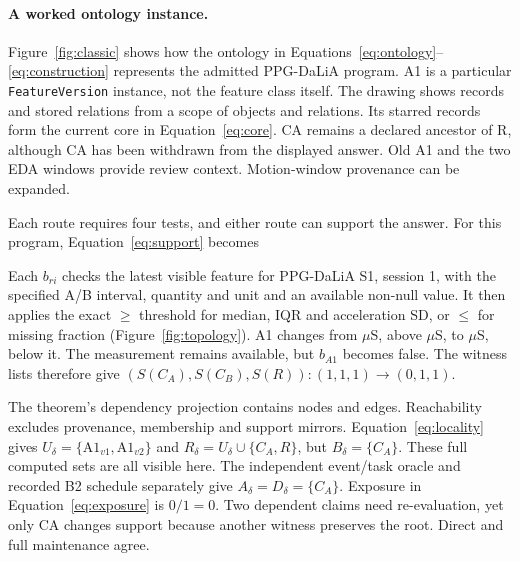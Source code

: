 \paragraph{A worked ontology instance.}
Figure~\ref{fig:classic} shows how the ontology in
Equations~\ref{eq:ontology}--\ref{eq:construction} represents the admitted
PPG-DaLiA program. A1 is a particular \texttt{FeatureVersion} instance, not the
feature class itself. The drawing shows \ClassicNodes{} records and
\ClassicEdges{} stored relations from a scope of \ClassicScopeNodes{} objects
and \ClassicScopeEdges{} relations. Its \ClassicCore{} starred records form the
current core in Equation~\ref{eq:core}. CA remains a declared ancestor of R,
although CA has been withdrawn from the displayed answer. Old A1 and the two
EDA windows provide review context. Motion-window provenance can be expanded.

Each route requires four tests, and either route can support the answer.
For this program, Equation~\ref{eq:support} becomes

Each $b_{ri}$ checks the latest visible feature for PPG-DaLiA S1, session 1,
with the specified A/B interval, quantity and unit and an available non-null value.
It then applies the exact $\geq$ threshold for median, IQR and acceleration SD,
or $\leq$ for missing fraction (Figure~\ref{fig:topology}). A1 changes from
\ClassicOldValue{} $\mu$S, above \ClassicThreshold{} $\mu$S, to
\ClassicNewValue{} $\mu$S, below it. The measurement remains available, but
$b_{A1}$ becomes false. The witness lists therefore give
$(S(C_A),S(C_B),S(R)): (1,1,1)\to(0,1,1)$.

The theorem's dependency projection contains \ClassicDependencyNodes{} nodes
and \ClassicDependencyEdges{} edges. Reachability excludes provenance, membership
and support mirrors. Equation~\ref{eq:locality} gives
$U_\delta=\{\mathrm{A1}_{v1},\mathrm{A1}_{v2}\}$ and
$R_\delta=U_\delta\cup\{C_A,R\}$, but $B_\delta=\{C_A\}$.
These full computed sets are all visible here. The independent event/task oracle
and recorded B2 schedule separately give $A_\delta=D_\delta=\{C_A\}$.
Exposure in Equation~\ref{eq:exposure} is $0/1=0$.
Two dependent claims need re-evaluation, yet only CA changes support because
another witness preserves the root. Direct and full maintenance agree.

